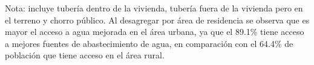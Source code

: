 Nota: incluye tubería dentro de la vivienda, tubería fuera de la vivienda pero en el terreno y chorro público. Al desagregar por área de residencia se observa que es mayor el acceso a agua mejorada en el área urbana, ya que el 89.1\% tiene acceso a mejores fuentes de abastecimiento de agua, en comparación con el 64.4\% de población que tiene acceso en el área rural.